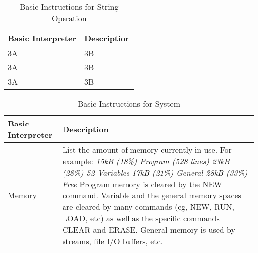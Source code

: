 \documentclass[11pt,fleqn]{book} %
\numberwithin{equation}{section} %
\numberwithin{figure}{section} %
\numberwithin{table}{section} %
\begin{document}
\begin{table}[]
\centering
\caption{Basic Instructions for String Operation}
\label{Basic_Instructions_for_String_Operation}
\begin{tabular}{|p{4cm}|p{10cm}|}
\hline
\textbf{Basic Interpreter} & \textbf{Description}                                                             \\ \hline
3A & 3B 
\\ \hline
3A & 3B 
\\ \hline
3A & 3B 
\\ \hline
\end{tabular}
\end{table}

\begin{table}[]
\centering
\caption{Basic Instructions for System}
\label{Basic_Instructions_for_System}
\begin{tabular}{|p{4cm}|p{10cm}|}
\hline
\textbf{Basic Interpreter} & \textbf{Description}                                                             \\ \hline
Memory & List the amount of memory currently in use. For example: \newline
 \textit{\newline 15kB (18\%) Program (528 lines) \newline 23kB (28\%) 52 Variables \newline 17kB (21\%) General \newline 28kB (33\%) Free} \newline \newline
Program memory is cleared by the NEW command. Variable and the general memory spaces are cleared by many commands (eg, NEW, RUN, LOAD, etc) as well as the specific commands CLEAR and ERASE. General memory is used by streams, file I/O buffers, etc.   
\\ \hline
\end{tabular}
\end{table}
\end{document}
